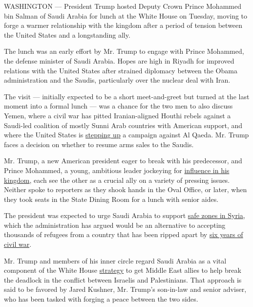 WASHINGTON --- President Trump hosted Deputy Crown Prince Mohammed bin
Salman of Saudi Arabia for lunch at the White House on Tuesday, moving
to forge a warmer relationship with the kingdom after a period of
tension between the United States and a longstanding ally.

The lunch was an early effort by Mr. Trump to engage with Prince
Mohammed, the defense minister of Saudi Arabia. Hopes are high in Riyadh
for improved relations with the United States after strained diplomacy
between the Obama administration and the Saudis, particularly over the
nuclear deal with Iran.

The visit --- initially expected to be a short meet-and-greet but turned
at the last moment into a formal lunch --- was a chance for the two men
to also discuss Yemen, where a civil war has pitted Iranian-aligned
Houthi rebels against a Saudi-led coalition of mostly Sunni Arab
countries with American support, and where the United States is
\href{https://www.nytimes3xbfgragh.onion/2017/03/03/world/middleeast/yemen-us-airstrikes-al-qaeda.html}{stepping
up} a campaign against Al Qaeda. Mr. Trump faces a decision on whether
to resume arms sales to the Saudis.

Mr. Trump, a new American president eager to break with his predecessor,
and Prince Mohammed, a young, ambitious leader jockeying for
\href{https://www.nytimes3xbfgragh.onion/2016/10/16/world/rise-of-saudi-prince-shatters-decades-of-royal-tradition.html}{influence
in his kingdom}, each see the other as a crucial ally on a variety of
pressing issues. Neither spoke to reporters as they shook hands in the
Oval Office, or later, when they took seats in the State Dining Room for
a lunch with senior aides.

The president was expected to urge Saudi Arabia to support
\href{https://www.nytimes3xbfgragh.onion/2016/12/15/us/politics/syria-safe-zones-donald-trump.html}{safe
zones in Syria}, which the administration has argued would be an
alternative to accepting thousands of refugees from a country that has
been ripped apart by
\href{https://www.nytimes3xbfgragh.onion/2016/09/19/world/middleeast/syria-civil-war-bashar-al-assad-refugees-islamic-state.html}{six
years of civil war}.

Mr. Trump and members of his inner circle regard Saudi Arabia as a vital
component of the White House
\href{https://www.nytimes3xbfgragh.onion/2017/02/09/world/middleeast/trump-arabs-palestinians-israel.html}{strategy}
to get Middle East allies to help break the deadlock in the conflict
between Israelis and Palestinians. That approach is said to be favored
by Jared Kushner, Mr. Trump's son-in-law and senior adviser, who has
been tasked with forging a peace between the two sides.

